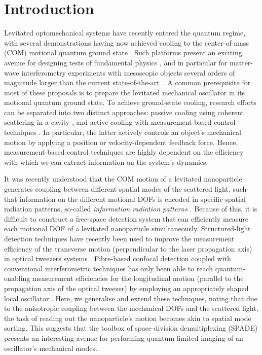 \documentclass[%
 reprint,
 amsmath,amssymb,
 aps,
pra,
]{revtex4-2}
\begin{document}
\section{Introduction}
Levitated optomechanical systems have recently entered the quantum regime, with several demonstrations having now achieved cooling to the center-of-mass (COM) motional quantum ground state \cite{delic_cooling_2020, magrini_real-time_2021, tebbenjohanns_quantum_2021, kamba_optical_2022}. Such platforms present an exciting avenue for designing tests of fundamental physics \cite{moore_search_2014, bose_spin_2017, afek_coherent_2022, kilian_dark_2024}, and in particular for matter-wave interferometry experiments with mesoscopic objects \cite{scala_matter-wave_2013} several orders of magnitude larger than the current state-of-the-art~\cite{fein_quantum_2019, arndt_testing_2014}. A common prerequisite for most of these proposals is to prepare the levitated mechanical oscillator in its motional quantum ground state. To achieve ground-state cooling, research efforts can be separated into two distinct approaches: passive cooling using coherent scattering in a cavity \cite{delic_cooling_2020, piotrowski_simultaneous_2023, ranfagni_two-dimensional_2022}, and active cooling with measurement-based control techniques \cite{magrini_real-time_2021, tebbenjohanns_quantum_2021}. In particular, the latter actively controls an object's mechanical motion by applying a position or velocity-dependent feedback force. Hence, measurement-based control techniques are highly dependent on the efficiency with which we can extract information on the system's dynamics.

It was recently understood that the COM motion of a levitated nanoparticle generates coupling between different spatial modes of the scattered light, such that information on the different motional DOFs is encoded in specific spatial radiation patterns, so-called \textsl{information radiation patterns} \cite{tebbenjohanns_optimal_2019, maurer_quantum_2023}. Because of this, it is difficult to construct a free-space detection system that can efficiently measure each motional DOF of a levitated nanoparticle simultaneously. Structured-light detection techniques have recently been used to improve the measurement efficiency of the transverse motion (perpendicular to the laser propagation axis) in optical tweezers systems \cite{madsen_ultrafast_2021, Li:23}. Fibre-based confocal detection coupled with conventional interferometric techniques has only been able to reach quantum-enabling measurement efficiencies for the longitudinal motion (parallel to the propagation axis of the optical tweezer) by employing an appropriately shaped local oscillator \cite{magrini_real-time_2021, tebbenjohanns_quantum_2021, kamba_optical_2022}. 
Here, we generalise and extend these techniques, noting that due to the anisotropic coupling between the mechanical DOFs and the scattered light, the task of reading out the nanoparticle's motion becomes akin to spatial mode sorting. This suggests that the toolbox of space-division demultiplexing (SPADE) presents an interesting avenue for performing quantum-limited imaging of an oscillator's mechanical modes.
\end{document}
